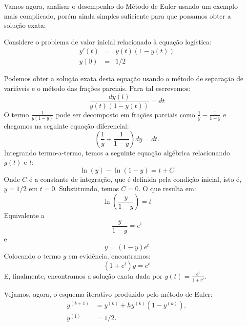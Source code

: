 Vamos agora, analisar o desempenho do Método de Euler usando um exemplo mais complicado, porém ainda simples suficiente para que possamos obter a solução exata:  
\begin{ex}\label{ex_euler_1} Considere o problema de valor inicial relacionado à equação logística:
\begin{eqnarray*}
y'(t)&=&y(t)(1-y(t))\\
y(0)&=&1/2
\end{eqnarray*}
\end{ex}
Podemos obter a solução exata desta equação usando o método de separação de variáveis e o método das frações parciais. Para tal escrevemos:
\begin{equation*}
\frac{dy(t)}{y(t)(1-y(t))}=dt
\end{equation*}
O termo $\frac{1}{y(1-y)}$ pode ser decomposto em frações parciais como $\frac{1}{y}-\frac{1}{1-y}$ e chegamos na seguinte equação diferencial:
\begin{equation*}
\left(\frac{1}{y}+\frac{1}{1-y}\right)dy=dt.
\end{equation*}
Integrando termo-a-termo, temos a seguinte equação algébrica relacionando $y(t)$ e $t$:
\begin{equation*}
\ln(y)-\ln(1-y)=t+C
\end{equation*}
Onde $C$ é a constante de integração, que é definida pela condição inicial, isto é, $y=1/2$ em $t=0$. Substituindo, temos $C=0$. O que resulta em:
\begin{equation*}
\ln\left(\frac{y}{1-y}\right)=t
\end{equation*}
Equivalente a
\begin{equation*}
\frac{y}{1-y}=e^{t}
\end{equation*}
e
\begin{equation*}
y=(1-y)e^{t} 
\end{equation*}
Colocando o termo $y$ em evidência, encontramos:
\begin{equation}
(1+e^t)y=e^{t} 
\end{equation}
E, finalmente, encontramos a solução exata dada por $y(t)=\frac{e^t}{1+e^{t}}$.

Vejamos, agora, o esquema iterativo produzido pelo método de Euler:
\begin{align}
y^{(k+1)}&= y^{(k)}+h y^{(k)}(1-y^{(k)}), \\
y^{(1)}&= 1/2.
\end{align}


